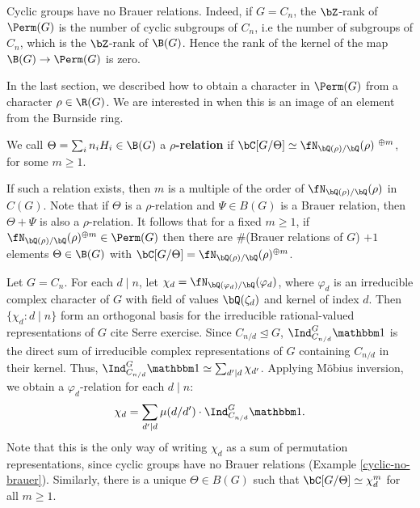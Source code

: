 \begin{example}\label{cyclic-no-brauer}
Cyclic groups have no Brauer relations. Indeed, if $G = C_n$, the $\bZ$-rank of $\Perm(G)$ is the number of cyclic subgroups of $C_n$, i.e the number of subgroups of $C_n$, which is the $\bZ$-rank of $\B(G)$. Hence the rank of the kernel of the map $\B(G) \to \Perm(G)$ is zero.
\end{example}

In the last section, we described how to obtain a character in $\Perm(G)$ from a character $\rho \in \R(G)$. We are interested in when this is an image of an element from the Burnside ring.

\begin{defn}
We call $\Theta = \sum_i n_i H_i \in \B(G)$ a \textbf{$\rho$-relation} if $\bC[G / \Theta] \simeq \repnorm{\rho}^{\ \oplus m}$, for some $m \geq 1$.
\end{defn}
\begin{rem}
If such a relation exists, then $m$ is a multiple of the order of $\repnorm{\rho}$ in $C(G)$. Note that if $\Theta$ is a $\rho$-relation and $\Psi \in B(G)$ is a Brauer relation, then $\Theta + \Psi$ is also a $\rho$-relation. It follows that for a fixed $m \geq 1$, if $\repnorm{\rho}^{\oplus m} \in \Perm(G)$ then there are $\#$(Brauer relations of $G$) $+ 1$ elements $\Theta \in \B(G)$ with $\bC[G / \Theta] = \repnorm{\rho}^{\oplus m}$.
\end{rem}

\begin{example}\label{cyclic-relns}
    Let $G = C_n$. For each $d \mid n$, let $\chi_d = \repnorm{\varphi_d}$, where $\varphi_d$ is an irreducible complex character of $G$ with field of values $\bQ(\zeta_d)$ and kernel of index $d$.
    Then $\{ \chi_d \colon d\mid n \}$ form an orthogonal basis for the irreducible rational-valued representations of $G$ {\color{red} cite Serre exercise}. Since $C_{n / d} \trianglelefteq G$, $\Ind_{C_{n/ d}}^G \trivial$ is the direct sum of irreducible complex representations of $G$ containing $C_{n / d}$ in their kernel. Thus, $\Ind_{C_{n/ d}}^G \trivial \simeq \sum_{d' \mid d} \chi_{d'}$. Applying M\"{o}bius inversion, we obtain a $\varphi_d$-relation for each $d \mid n$:
    \[ \chi_d = \sum_{d' \mid d} \mu(d / d') \cdot \Ind_{C_{n/ d}}^G \trivial. \]
    Note that this is the only way of writing $\chi_d$ as a sum of permutation representations, since cyclic groups have no Brauer relations (Example \ref{cyclic-no-brauer}). Similarly, there is a unique $\Theta \in B(G)$ such that $\bC[G / \Theta] \simeq \chi_d^{m}$ for all $m \geq 1$.
    \end{example}

